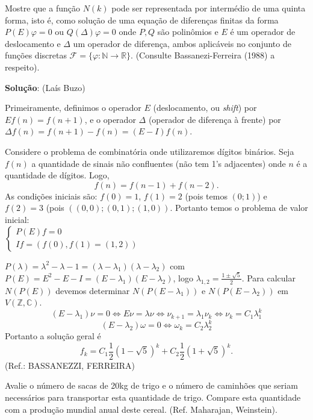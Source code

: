 \begin{exercise}
Mostre que a função \(N(k)\) pode ser representada por intermédio de uma quinta forma, isto é, como solução de uma equação de diferenças finitas da forma \(P(E) \varphi = 0\) ou \(Q(\Delta) \varphi = 0\) onde \(P, Q\) são polinômios e \(E\) é um operador de deslocamento e \(\Delta\) um operador de diferença, ambos aplicáveis no conjunto de funções discretas \(\mathcal{F} = \{\varphi: \mathbb{N} \to \mathbb{R}\}\). (Consulte Bassanezi-Ferreira (1988) a respeito).
\end{exercise}

{\color{red}
\textbf{Solução}: (Laís Buzo)

Primeiramente, definimos o operador $E$ (deslocamento, ou \textit{shift}) por $Ef(n)=f(n+1)$, e o operador $\Delta$ (operador de diferença à frente) por $\Delta f(n)=f(n+1)-f(n)=(E-I)f(n)$.

		Considere o problema de combinatória onde utilizaremos dígitos binários. Seja $f(n)$ a quantidade de sinais não confluentes (não tem 1's adjacentes) onde $n$ é a quantidade de dígitos. Logo,
		$$f(n)=f(n-1)+f(n-2).$$
		As condições iniciais são: $f(0)=1$, $f(1)=2$ (pois temos $(0;1)$) e $f(2)=3$ (pois $((0,0);(0,1);(1,0))$. Portanto temos o problema de valor inicial:\\
		$\begin{cases}
			P(E)f=0\\
			If=(f(0),f(1)=(1,2))
		\end{cases}$
		
		$P(\lambda)=\lambda^2-\lambda-1=(\lambda-\lambda_1)(\lambda-\lambda_2)$ com $P(E)=E^2-E-I=(E-\lambda_1)(E-\lambda_2)$, logo $\lambda_{1,2}=\frac{1\pm \sqrt{5}}{2}$.
		Para calcular $N(P(E))$ devemos determinar $N(P(E-\lambda_1))$ e $N(P(E-\lambda_2))$ em $V(\mathbb{Z},\mathbb{C})$.
		$$(E-\lambda_1)\nu=0 \iff E\nu=\lambda \nu \iff \nu_{k+1}=\lambda_1\nu_k \iff \nu_k=C_1\lambda_1^k$$
		$$(E-\lambda_2)\omega=0 \iff \omega_k=C_2\lambda_2^k$$
		Portanto a solução geral é 
		$$f_k=C_1\frac{1}{2}(1-\sqrt{5})^{k}+C_2\frac{1}{2}(1+\sqrt{5})^{k}.$$
	(Ref.: BASSANEZZI, FERREIRA)

}


\begin{exercise}
Avalie o número de sacas de 20kg de trigo e o número de caminhões que seriam necessários para transportar esta quantidade de trigo. Compare esta quantidade com a produção mundial anual deste cereal. (Ref. Maharajan, Weinstein).
\end{exercise}

